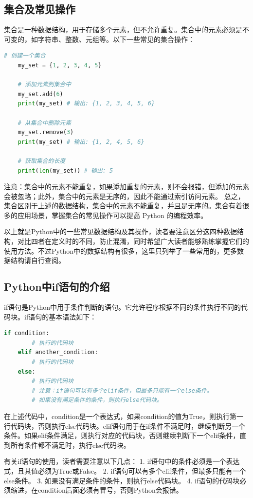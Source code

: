 \subsection{集合及常见操作}
集合是一种数据结构，用于存储多个元素，但不允许重复。集合中的元素必须是不可变的，如字符串、整数、元组等。以下一些常见的集合操作：
\begin{lstlisting}[language=Python]
    # 创建一个集合
    my_set = {1, 2, 3, 4, 5}
    
    # 添加元素到集合中
    my_set.add(6)
    print(my_set) # 输出: {1, 2, 3, 4, 5, 6}
    
    # 从集合中删除元素
    my_set.remove(3)
    print(my_set) # 输出: {1, 2, 4, 5, 6}
    
    # 获取集合的长度
    print(len(my_set)) # 输出: 5
\end{lstlisting}
\newpage
注意：集合中的元素不能重复，如果添加重复的元素，则不会报错，但添加的元素会被忽略；此外，集合中的元素是无序的，因此不能通过索引访问元素。
总之，集合区别于上述的数据结构，集合中的元素不能重复，并且是无序的。集合有着很多的应用场景，掌握集合的常见操作可以提高 Python 的编程效率。
\par
以上就是Python中的一些常见数据结构及其操作，读者要注意区分这四种数据结构，对比四者在定义时的不同，防止混淆，同时希望广大读者能够熟练掌握它们的使用方法。不过Python中的数据结构有很多，这里只列举了一些常用的，更多数据结构请自行查阅。



\subsection{Python中if语句的介绍}
if语句是Python中用于条件判断的语句。它允许程序根据不同的条件执行不同的代码块。if语句的基本语法如下：
\begin{lstlisting}[language=Python]
    if condition:
        # 执行的代码块
    elif another_condition:
        # 执行的代码块
    else:
        # 执行的代码块
        # 注意：if语句可以有多个elif条件，但最多只能有一个else条件。
        # 如果没有满足条件的条件，则执行else代码块。
\end{lstlisting}
在上述代码中，condition是一个表达式，如果condition的值为True，则执行第一行代码块，否则执行else代码块。elif语句用于在if条件不满足时，继续判断另一个条件。如果elif条件满足，则执行对应的代码块，否则继续判断下一个elif条件，直到所有条件都不满足时，执行else代码块。
\par
有关if语句的使用，读者需要注意以下几点：
1. if语句中的条件必须是一个表达式，且其值必须为True或False。
2. if语句可以有多个elif条件，但最多只能有一个else条件。
3. 如果没有满足条件的条件，则执行else代码块。
4. if语句的代码块必须缩进，在condition后面必须有冒号，否则Python会报错。
\par



